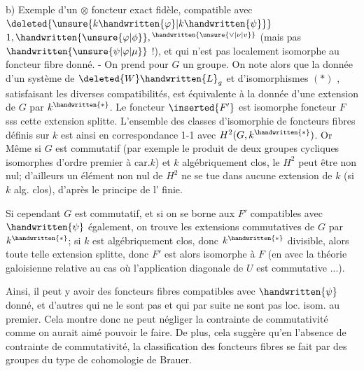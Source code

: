 
b) Exemple d'un $\otimes$ foncteur exact fidèle, compatible avec $\deleted{\unsure{k\handwritten{\varphi}|k\handwritten{\psi}}}$ $1,\handwritten{\unsure{\varphi|\phi}},{}^{\handwritten{\unsure{\vee|\nu|v}}}$ (mais pas  $\handwritten{\unsure{\psi|\varphi|\mu}}$ !), et qui n'est pas localement isomorphe au foncteur fibre donné. - On prend pour $G$ un groupe. On note alors que la donnée d'un système de $\deleted{W}\handwritten{L}_{g}$ et d'isomorphismes $(*)$ , satisfaisant les diverses compatibilités, est équivalente à la donnée d'une extension de $G$ par $k^{\handwritten{*}}$. Le foncteur $\inserted{F'}$ est isomorphe  foncteur $F$ sss cette extension splitte. L'ensemble des classes d'isomorphie de foncteurs fibres définis sur $k$ est ainsi en correspondance 1-1 avec $H^{2}(G,k^{\handwritten{*}})$. Or Même si $G$ est commutatif (par exemple le produit de deux groupes cycliques isomorphes d'ordre premier à  $\mathrm{car}.k$) et $k$ algébriquement clos, le $H^{2}$ peut être non nul;  d'ailleurs un élément non nul de $H^{2}$ ne se tue dans aucune extension de $k$ (si $k$ alg. clos), d'après le principe de l' finie.

Si cependant $G$ est commutatif, et si on se borne aux $F'$ compatibles avec $\handwritten{\psi}$ également, on trouve les extensions commutatives de $G$ par $k^{\handwritten{*}}$; si $k$ est algébriquement clos, donc $k^{\handwritten{*}}$ divisible, alors toute telle extension splitte, donc $F'$ est alors isomorphe à $F$ (en  avec la théorie galoisienne relative au cas où l'application diagonale de $U$ est commutative ...).

Ainsi, il peut y avoir des foncteurs fibres compatibles avec $\handwritten{\psi}$ donné, et d'autres qui ne le sont pas et qui par suite ne sont pas loc. isom. au premier. Cela montre donc   ne peut négliger la  contrainte de commutativité comme on aurait aimé pouvoir le faire. De plus,  cela suggère qu'en l'absence de contrainte de commutativité, la classification des foncteurs fibres se fait par des groupes du type de cohomologie de Brauer.

